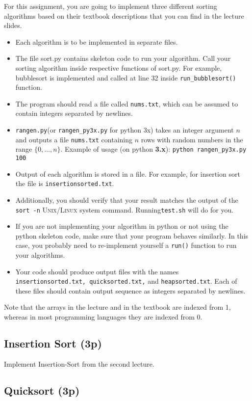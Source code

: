 \documentclass{article}
\newcommand{\mset}[1]{\lbrace #1 \rbrace}
\begin{document}
For this assignment, you are going to implement three different sorting algorithms
based on their textbook descriptions that you can find in the lecture slides.
\begin{itemize}
\item Each algorithm is to be implemented in separate files. 
\item The file sort.py contains skeleton code to run your algorithm. Call your sorting algorithm inside respective functions of sort.py. For example, bubblesort is implemented and called at line 32 inside {\tt run\_bubblesort()} function.
\item The program should read a file called {\tt nums.txt}, which can be assumed to contain integers separated by newlines.
\item {\tt rangen.py}(or {\tt rangen\_py3x.py} for python 3x)
takes an integer argument $n$ and outputs a file {\tt nums.txt} containing $n$ rows with random numbers in the range $\mset{0, \dots, n}$. 
Example of usage (on python \textbf{3.x}): {\tt python rangen\_py3x.py 100}
\item Output of each algorithm is stored in a file. For example, for insertion sort the file is {\tt insertionsorted.txt}.
\item Additionally, you should verify that your result matches the output of the {\tt sort -n} \textsc{Unix/Linux} system command. Running{\tt test.sh} will do for you.
\item If you are not implementing your algorithm in python or not using the python skeleton code, make sure that your program behaves similarly.
In this case, you probably need to re-implement yourself a \texttt{run()} function to run your algorithms. 
\item Your code should produce output files with the names {\tt insertionsorted.txt, quicksorted.txt,} and {\tt heapsorted.txt}.
Each of these files should contain output sequence as integers separated by newlines.
\end{itemize}
Note that the arrays in the lecture and in the textbook are indexed from 1,
whereas in most programming languages they are indexed from 0.


\subsection*{Insertion Sort (3p)}

Implement {\sc Insertion-Sort}  from the second lecture.

\subsection*{Quicksort (3p)}
\end{document}
